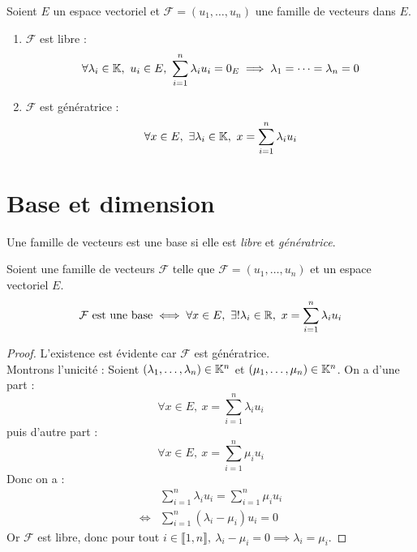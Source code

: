 \begin{definition}
	Soient $E$ un espace vectoriel et $\mathcal{F} = (u_1, \ldots, u_n)$ une famille de vecteurs dans $E$.
	\begin{enumerate}
		\item $\mathcal{F}$ est libre :
		\begin{align*}
			\forall \lambda_i \in \mathbb{K},\ u_i \in E,\ \sum_{i = 1}^n \lambda_i u_i = 0_E \implies \lambda_1 = \cdots = \lambda_n = 0
		\end{align*}
		\item $\mathcal{F}$ est génératrice :
		\begin{align*}
			\forall x \in E,\ \exists \lambda_i \in \mathbb{K},\ x = \sum_{i = 1}^n \lambda_i u_i 
		\end{align*}
	\end{enumerate}
\end{definition}

\section{Base et dimension}
\begin{definition}[Base]
	Une famille de vecteurs est une base si elle est \emph{libre} et \emph{génératrice}.
\end{definition}

\begin{proposition}
	Soient une famille de vecteurs $\mathcal{F}$ telle que $\mathcal{F} = (u_1, \ldots, u_n)$ et un espace vectoriel $E$.
	\[ 
	\mathcal{F} \text{ est une base} \iff 
	\forall x \in E,\ \exists ! \lambda_i \in \mathbb{R},\ x = \sum_{i = 1}^n \lambda_i u_i
	\]
\end{proposition}

\begin{proof}
	L'existence est évidente car $\mathcal{F}$ est génératrice. 
	\\
	Montrons l'unicité : Soient $(\lambda_1, \ldots, \lambda_n) \in \mathbb{K}^n$ et $(\mu_1, \ldots, \mu_n) \in \mathbb{K}^n$.
	On a d'une part :
	\[ \forall x \in E,\ x = \sum_{i=1}^{n} \lambda_i u_i \]
	puis d'autre part :
	\[ \forall x \in E,\ x = \sum_{i=1}^{n} \mu_i u_i \]
	Donc on a :
	\begin{align*}
		&\sum_{i=1}^{n} \lambda_i u_i = \sum_{i=1}^{n} \mu_i u_i \\
		\iff &\sum_{i=1}^{n} (\lambda_i - \mu_i) u_i = 0 
	\end{align*}
	Or $\mathcal{F}$ est libre, donc pour tout $i \in \llbracket 1, n \rrbracket,\ \lambda_i - \mu_i = 0 \implies \lambda_i = \mu_i$.
\end{proof}

